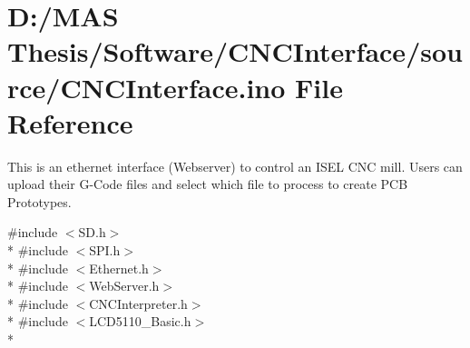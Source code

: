 \hypertarget{_c_n_c_interface_8ino}{\section{D\-:/\-M\-A\-S Thesis/\-Software/\-C\-N\-C\-Interface/source/\-C\-N\-C\-Interface.ino File Reference}
\label{_c_n_c_interface_8ino}
}


This is an ethernet interface (Webserver) to control an I\-S\-E\-L C\-N\-C mill. Users can upload their G-\/\-Code files and select which file to process to create P\-C\-B Prototypes.  


{\ttfamily \#include $<$S\-D.\-h$>$}\\*
{\ttfamily \#include $<$S\-P\-I.\-h$>$}\\*
{\ttfamily \#include $<$Ethernet.\-h$>$}\\*
{\ttfamily \#include $<$Web\-Server.\-h$>$}\\*
{\ttfamily \#include $<$C\-N\-C\-Interpreter.\-h$>$}\\*
{\ttfamily \#include $<$L\-C\-D5110\-\_\-\-Basic.\-h$>$}\\*
